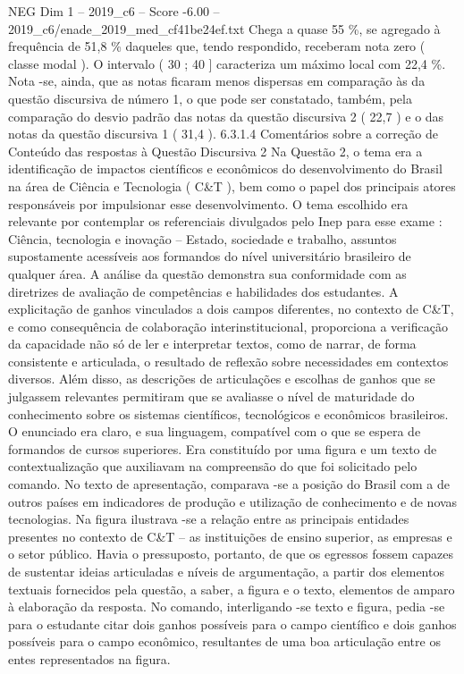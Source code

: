 \begin{textsample}{NEG Dim 1 – 2019\_c6 – Score -6.00 – 2019\_c6/enade\_2019\_med\_cf41be24ef.txt}
Chega a quase 55 \%, se agregado à frequência de 51,8 \% daqueles que, tendo respondido, receberam nota zero ( classe modal ).
O intervalo ( 30 ; 40 ] caracteriza um máximo local com 22,4 \%.
Nota -se, ainda, que as notas ficaram menos dispersas em comparação às da questão discursiva de número 1, o que pode ser constatado, também, pela comparação do desvio padrão das notas da questão discursiva 2 ( 22,7 ) e o das notas da questão discursiva 1 ( 31,4 ). 6.3.1.4 Comentários sobre a correção de Conteúdo das respostas à Questão Discursiva 2 Na Questão 2, o tema era a identificação de impactos científicos e econômicos do desenvolvimento do Brasil na área de Ciência e Tecnologia ( C\&T ), bem como o papel dos principais atores responsáveis por impulsionar esse desenvolvimento.
O tema escolhido era relevante por contemplar os referenciais divulgados pelo Inep para esse exame : Ciência, tecnologia e inovação – Estado, sociedade e trabalho, assuntos supostamente acessíveis aos formandos do nível universitário brasileiro de qualquer área.
A análise da questão demonstra sua conformidade com as diretrizes de avaliação de competências e habilidades dos estudantes.
A explicitação de ganhos vinculados a dois campos diferentes, no contexto de C\&T, e como consequência de colaboração interinstitucional, proporciona a verificação da capacidade não só de ler e interpretar textos, como de narrar, de forma consistente e articulada, o resultado de reflexão sobre necessidades em contextos diversos.
Além disso, as descrições de articulações e escolhas de ganhos que se julgassem relevantes permitiram que se avaliasse o nível de maturidade do conhecimento sobre os sistemas científicos, tecnológicos e econômicos brasileiros.
O enunciado era claro, e sua linguagem, compatível com o que se espera de formandos de cursos superiores.
Era constituído por uma figura e um texto de contextualização que auxiliavam na compreensão do que foi solicitado pelo comando.
No texto de apresentação, comparava -se a posição do Brasil com a de outros países em indicadores de produção e utilização de conhecimento e de novas tecnologias.
Na figura ilustrava -se a relação entre as principais entidades presentes no contexto de C\&T – as instituições de ensino superior, as empresas e o setor público.
Havia o pressuposto, portanto, de que os egressos fossem capazes de sustentar ideias articuladas e níveis de argumentação, a partir dos elementos textuais fornecidos pela questão, a saber, a figura e o texto, elementos de amparo à elaboração da resposta.
No comando, interligando -se texto e figura, pedia -se para o estudante citar dois ganhos possíveis para o campo científico e dois ganhos possíveis para o campo econômico, resultantes de uma boa articulação entre os entes representados na figura.

\end{textsample}
